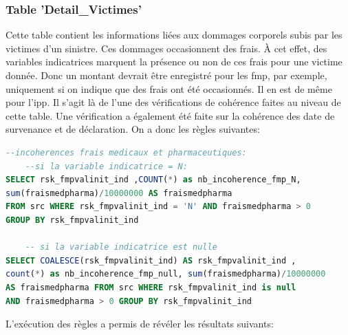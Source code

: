 \subsubsection{\textbf{Table 'Detail\_Victimes'}}
Cette table contient les informations li\'ees aux dommages corporels subis par les victimes d'un sinistre. Ces dommages occasionnent des frais. \`A cet effet, des variables indicatrices marquent la pr\'esence ou non de ces frais pour une victime donn\'ee. Donc un montant devrait \^etre enregistr\'e pour les \acrfull{fmp}, par exemple, uniquement si on indique que des frais ont \'et\'e occasionn\'es. Il en est de m\^eme pour l'\acrfull{ipp}. Il s'agit l\`a de l'une des v\'erifications de coh\'erence faites au niveau de cette table. Une v\'erification a \'egalement \'et\'e faite sur la coh\'erence des date de survenance et de d\'eclaration. On a donc les r\`egles suivantes:
\begin{lstlisting}[language=SQL,caption={R\`egle de la Dimension Coh\'erence pour la table \textit{Detail\_Victimes}},captionpos=t,showspaces=false,basicstyle=\scriptsize,numbers=none,commentstyle=\color{gray},backgroundcolor=\color{background}]
--incoherences frais medicaux et pharmaceutiques: 
	--si la variable indicatrice = N:
SELECT rsk_fmpvalinit_ind ,COUNT(*) as nb_incoherence_fmp_N, 
sum(fraismedpharma)/10000000 AS fraismedpharma 
FROM src WHERE rsk_fmpvalinit_ind = 'N' AND fraismedpharma > 0 
GROUP BY rsk_fmpvalinit_ind

	-- si la variable indicatrice est nulle
SELECT COALESCE(rsk_fmpvalinit_ind) AS rsk_fmpvalinit_ind , 
count(*) as nb_incoherence_fmp_null, sum(fraismedpharma)/10000000 
AS fraismedpharma FROM src WHERE rsk_fmpvalinit_ind is null 
AND fraismedpharma > 0 GROUP BY rsk_fmpvalinit_ind
\end{lstlisting}
L'ex\'ecution des r\`egles a permis de r\'ev\'eler les r\'esultats suivants: 


